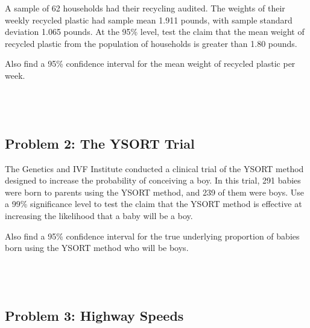 \documentclass[]{article}
\begin{document}
A sample of 62 households had their recycling audited. The weights of
their weekly recycled plastic had sample mean 1.911 pounds, with sample
standard deviation 1.065 pounds. At the 95\% level, test the claim that
the mean weight of recycled plastic from the population of households is
greater than 1.80 pounds.

Also find a 95\% confidence interval for the mean weight of recycled
plastic per week.

\hypertarget{section}{%
\subsection{\texorpdfstring{\(\;\)}{\textbackslash{};}}\label{section}}

\hypertarget{section-1}{%
\subsection{\texorpdfstring{\(\;\)}{\textbackslash{};}}\label{section-1}}

\hypertarget{problem-2-the-ysort-trial}{%
\subsection{Problem 2: The YSORT
Trial}\label{problem-2-the-ysort-trial}}

The Genetics and IVF Institute conducted a clinical trial of the YSORT
method designed to increase the probability of conceiving a boy. In this
trial, 291 babies were born to parents using the YSORT method, and 239
of them were boys. Use a 99\% significance level to test the claim that
the YSORT method is effective at increasing the likelihood that a baby
will be a boy.

Also find a 95\% confidence interval for the true underlying proportion
of babies born using the YSORT method who will be boys.

\hypertarget{section-2}{%
\subsection{\texorpdfstring{\(\;\)}{\textbackslash{};}}\label{section-2}}

\hypertarget{section-3}{%
\subsection{\texorpdfstring{\(\;\)}{\textbackslash{};}}\label{section-3}}

\hypertarget{problem-3-highway-speeds}{%
\subsection{Problem 3: Highway Speeds}\label{problem-3-highway-speeds}}
\end{document}
